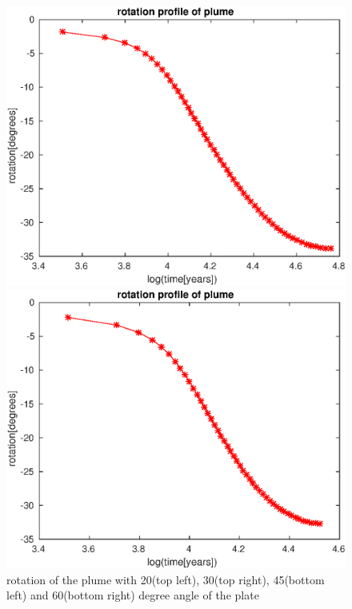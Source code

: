 \documentclass[12pt]{scrreprt}
\begin{document}
\begin{figure}[!ht]
\begin{minipage}[t]{1.0\textwidth}
\begin{minipage}[t]{0.5\textwidth}
		\end{minipage}
	\end{minipage}
	\begin{minipage}[t]{1.0\textwidth}	
		\begin{minipage}[t]{0.5\textwidth}
		\includegraphics[width=1.0\textwidth]{./Snapshots/ref/Subductionzonewithblobposrefslab45s2e7s2e7r20rotation.eps}
		\end{minipage}
		\begin{minipage}[t]{0.5\textwidth}
		\includegraphics[width=1.0\textwidth]{./Snapshots/ref/Subductionzonewithblobposrefslab60s2e7s2e7r20rotation.eps}
		\end{minipage}
	\end{minipage}
	\caption{rotation of the plume with 20(top left), 30(top right), 45(bottom left) and 60(bottom right) degree angle of the plate}
	\label{fig:rotationinitial}
\end{figure}
\end{document}
